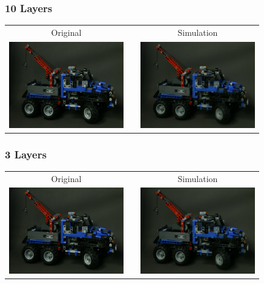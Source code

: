 \documentclass[12pt, compress]{beamer}
\begin{document}
\begin{frame}[fragile]
	\frametitle{10 Layers}
	
	\begin{center}
		\begin{tabular}{c p{0cm} c}
			Original & & Simulation \\
			\includegraphics[width = 5cm, trim={4cm, 20cm, 30cm, 0}, clip]{images/layers_and_projections/legotruck/original/08_08}
			& & \includegraphics[width = 5cm, trim={2cm, 10cm, 15cm, 0}, clip]{figures/simulated_views/legotruck/10Layers_legotruck/Reconstruction_of_view_(3,3)}
		\end{tabular}
	\end{center}
\end{frame}

\begin{frame}[fragile]
	\frametitle{3 Layers}
	
	\begin{center}
		\begin{tabular}{c p{0cm} c}
			Original & & Simulation \\
			\includegraphics[width = 5cm, trim={15cm, 10cm, 15cm, 10cm}, clip]{images/layers_and_projections/legotruck/original/08_08}
			& & \includegraphics[width = 5cm, trim={7.5cm, 5cm, 7.5cm, 5cm}, clip]{figures/simulated_views/legotruck/3Layers_legotruck/Reconstruction_of_view_(3,3)}
		\end{tabular}
	\end{center}
\end{frame}
\end{document}
